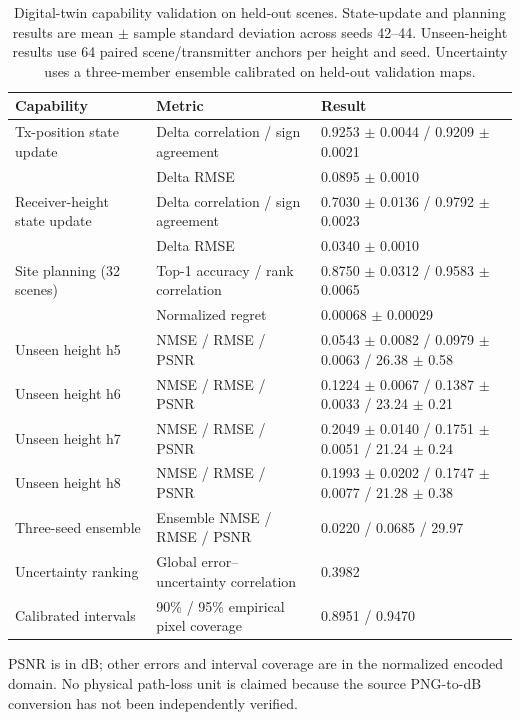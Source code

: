 \begin{table}[t]
\centering
\caption{Digital-twin capability validation on held-out scenes. State-update and planning results are mean $\pm$ sample standard deviation across seeds 42--44. Unseen-height results use 64 paired scene/transmitter anchors per height and seed. Uncertainty uses a three-member ensemble calibrated on held-out validation maps.}
\label{tab:twin_validation}
\setlength{\tabcolsep}{5pt}
\begin{tabular}{lll}
\toprule
Capability & Metric & Result \\
\midrule
Tx-position state update & Delta correlation / sign agreement & 0.9253 $\pm$ 0.0044 / 0.9209 $\pm$ 0.0021 \\
 & Delta RMSE & 0.0895 $\pm$ 0.0010 \\
Receiver-height state update & Delta correlation / sign agreement & 0.7030 $\pm$ 0.0136 / 0.9792 $\pm$ 0.0023 \\
 & Delta RMSE & 0.0340 $\pm$ 0.0010 \\
Site planning (32 scenes) & Top-1 accuracy / rank correlation & 0.8750 $\pm$ 0.0312 / 0.9583 $\pm$ 0.0065 \\
 & Normalized regret & 0.00068 $\pm$ 0.00029 \\
\midrule
Unseen height h5 & NMSE / RMSE / PSNR & 0.0543 $\pm$ 0.0082 / 0.0979 $\pm$ 0.0063 / 26.38 $\pm$ 0.58 \\
Unseen height h6 & NMSE / RMSE / PSNR & 0.1224 $\pm$ 0.0067 / 0.1387 $\pm$ 0.0033 / 23.24 $\pm$ 0.21 \\
Unseen height h7 & NMSE / RMSE / PSNR & 0.2049 $\pm$ 0.0140 / 0.1751 $\pm$ 0.0051 / 21.24 $\pm$ 0.24 \\
Unseen height h8 & NMSE / RMSE / PSNR & 0.1993 $\pm$ 0.0202 / 0.1747 $\pm$ 0.0077 / 21.28 $\pm$ 0.38 \\
\midrule
Three-seed ensemble & Ensemble NMSE / RMSE / PSNR & 0.0220 / 0.0685 / 29.97 \\
Uncertainty ranking & Global error--uncertainty correlation & 0.3982 \\
Calibrated intervals & 90\% / 95\% empirical pixel coverage & 0.8951 / 0.9470 \\
\bottomrule
\end{tabular}
\vspace{2pt}
\parbox{0.98\textwidth}{\footnotesize PSNR is in dB; other errors and interval coverage are in the normalized encoded domain. No physical path-loss unit is claimed because the source PNG-to-dB conversion has not been independently verified.}
\end{table}
